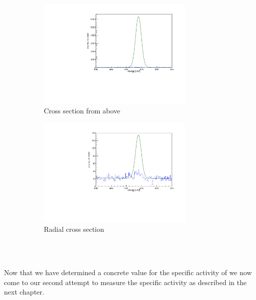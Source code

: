 \documentclass[encoding=utf8,british]{tumphthesis}
\begin{document}
\begin{figure}[t!]
	\centering
	\begin{subfigure}{.5\textwidth}
		\centering
		\includegraphics[width=75mm]{./Bilder/WARP.pdf}
		\caption{Cross section from above}
		\label{fig:WARP}
	\end{subfigure}%
	\begin{subfigure}{.5\textwidth}
		\centering
		\includegraphics[width=75mm]{./Bilder/Darkside.pdf}
		\caption{Radial cross section}
		\label{fig:Darkside}
	\end{subfigure}
    \\
	\vspace{0.5cm}
    \caption{}
\vspace{0.5cm}
\end{figure}
\\

Now that we have determined a concrete value for the specific activity of \Kr we now come to our second attempt to measure the specific activity as described in the next chapter.
\\  







\end{document}
